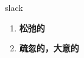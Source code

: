 
\begin{frame}
{\huge slack}
\begin{center}
\begin{enumerate}\Large
  \item \textbf{松弛的}
  \item \textbf{疏忽的，大意的}
\end{enumerate}
\end{center}
\end{frame}

